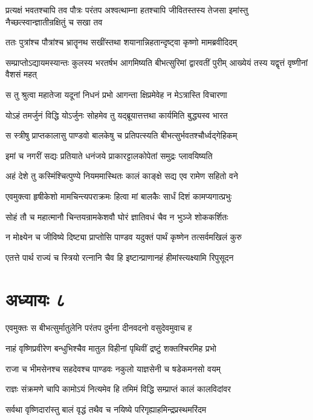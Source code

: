 \threelineshloka
{प्रत्यक्षं भवतश्चापि तव पौत्रः परंतप}
{अश्वत्थाम्ना हतश्चापि जीवितस्तस्य तेजसा}
{इमांस्तु नैच्छत्स्वान्ज्ञातीन्रक्षितुं च सखा तव}


\twolineshloka
{ततः पुत्रांश्च पौत्रांश्च भ्रातॄनथ सखींस्तथा}
{शयानान्निहतान्दृष्ट्वा कृष्णो मामब्रवीदिदम्}


\threelineshloka
{सम्प्राप्तोऽद्यायमस्यान्तः कुलस्य भरतर्षभ}
{आगमिष्यति बीभत्सुरिमां द्वारवतीं पुरीम्}
{आख्येयं तस्य यद्वृत्तं वृष्णीनां वैशसं महत्}


\twolineshloka
{स तु श्रुत्वा महातेजा यदूनां निधनं प्रभो}
{आगन्ता क्षिप्रमेवेह न मेऽत्रास्ति विचारणा}


\twolineshloka
{योऽहं तमर्जुनं विद्धि योऽर्जुनः सोहमेव तु}
{यद्ब्रूयात्तत्तथा कार्यमिति बुद्ध्यस्व भारत}


\twolineshloka
{स स्त्रीषु प्राप्तकालासु पाण्डवो बालकेषु च}
{प्रतिपत्स्यति बीभत्सुर्भवतश्चौर्ध्वद्गेहिकम्}


\twolineshloka
{इमां च नगरीं सद्यः प्रतियाते धनंजये}
{प्राकारट्टालकोपेतां समुद्रः प्लावयिष्यति}


\twolineshloka
{अहं देशे तु कस्मिंश्चित्पुण्ये नियममास्थितः}
{कालं काङ्क्षे सद्य एव रामेण सहितो वने}


\twolineshloka
{एवमुक्त्वा हृषीकेशो मामचिन्त्यपराक्रमः}
{हित्वा मां बालकैः सार्धं दिशं कामप्यगात्प्रभुः}


\twolineshloka
{सोहं तौ च महात्मानौ चिन्तयन्रामकेशवौ}
{घोरं ज्ञातिवधं चैव न भुञ्जे शोककर्शितः}


\twolineshloka
{न मोक्ष्येन च जीविष्ये दिष्ट्या प्राप्तोसि पाण्डव}
{यदुक्तं पार्थं कृष्णेन तत्सर्वमखिलं कुरु}


\twolineshloka
{एतत्ते पार्थ राज्यं च स्त्रियो रत्नानि चैव हि}
{इष्टान्प्राणानहं हीमांस्त्यक्ष्यामि रिपुसूदन}


\chapter{अध्यायः ८}
\twolineshloka
{एवमुक्तः स बीभत्सुर्मातुलेनि परंतप}
{दुर्मना दीनवदनो वसुदेवमुवाच ह}


\twolineshloka
{नाहं वृष्णिप्रवीरेण बन्धुभिश्चैव मातुल}
{विहीनां पृथिवीं द्रष्टुं शक्तश्चिरमिह प्रभो}


\twolineshloka
{राजा च भीमसेनश्च सहदेवश्च पाण्डवः}
{नकुलो याज्ञसेनी च षडेकमनसो वयम्}


\twolineshloka
{राज्ञः संक्रमणे चापि कामोऽयं नित्यमेव हि}
{तमिमं विद्धि सम्प्राप्तं कालं कालविदांवर}


\twolineshloka
{सर्वथा वृष्णिदारांस्तु बालं वृद्धं तथैव च}
{नयिष्ये परिगृह्याहमिन्द्रप्रस्थमरिंदम}


